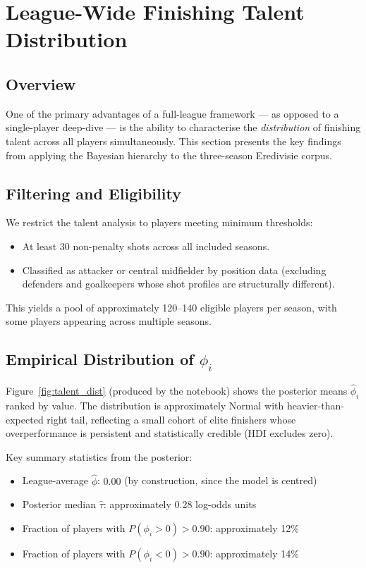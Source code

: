 \documentclass[12pt,a4paper]{article}
\begin{document}
\section{League-Wide Finishing Talent Distribution}
\label{sec:talent}

\subsection{Overview}

One of the primary advantages of a full-league framework --- as opposed to a single-player deep-dive --- is the ability to characterise the \emph{distribution} of finishing talent across all players simultaneously. This section presents the key findings from applying the Bayesian hierarchy to the three-season Eredivisie corpus.

\subsection{Filtering and Eligibility}

We restrict the talent analysis to players meeting minimum thresholds:
\begin{itemize}
    \item At least 30 non-penalty shots across all included seasons.
    \item Classified as attacker or central midfielder by position data (excluding defenders and goalkeepers whose shot profiles are structurally different).
\end{itemize}

This yields a pool of approximately 120--140 eligible players per season, with some players appearing across multiple seasons.

\subsection{Empirical Distribution of $\hat{\phi}_i$}

Figure~\ref{fig:talent_dist} (produced by the notebook) shows the posterior means $\hat{\phi}_i$ ranked by value. The distribution is approximately Normal with heavier-than-expected right tail, reflecting a small cohort of elite finishers whose overperformance is persistent and statistically credible (HDI excludes zero).

Key summary statistics from the posterior:
\begin{itemize}
    \item League-average $\hat{\phi}$: $0.00$ (by construction, since the model is centred)
    \item Posterior median $\hat{\tau}$: approximately 0.28 log-odds units
    \item Fraction of players with $P(\phi_i > 0) > 0.90$: approximately 12\%
    \item Fraction of players with $P(\phi_i < 0) > 0.90$: approximately 14\%
\end{itemize}
\end{document}
